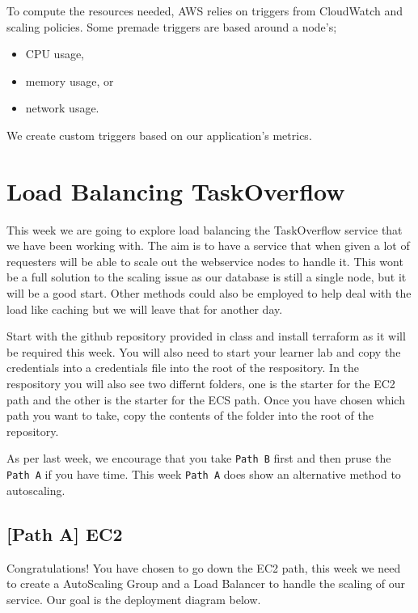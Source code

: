 \documentclass{csse4400}
\begin{document}
To compute the resources needed, AWS relies on triggers from CloudWatch and scaling policies.
Some premade triggers are based around a node's;

\begin{itemize}
    \item CPU usage,
    \item memory usage, or 
    \item network usage.
\end{itemize}

We create custom triggers based on our application's metrics.

\section{Load Balancing TaskOverflow}

This week we are going to explore load balancing the TaskOverflow service that we have been working with. The aim is to have a service that when given a lot of requesters will be able to scale out the webservice nodes to handle it. This wont be a full solution to the scaling issue as our database is still a single node, but it will be a good start. Other methods could also be employed to help deal with the load like caching but we will leave that for another day.

Start with the github repository provided in class and install terraform as it will be required this week. You will also need to start your learner lab and copy the credentials into a credentials file into the root of the respository. In the respository you will also see two differnt folders, one is the starter for the EC2 path and the other is the starter for the ECS path. Once you have chosen which path you want to take, copy the contents of the folder into the root of the repository.

As per last week, we encourage that you take \texttt{Path B} first and then pruse the \texttt{Path A} if you have time. This week \texttt{Path A} does show an alternative method to autoscaling.

\subsection{[Path A] EC2}

Congratulations! You have chosen to go down the EC2 path, this week we need to create a AutoScaling Group and a Load Balancer to handle the scaling of our service. Our goal is the deployment diagram below.
\end{document}
